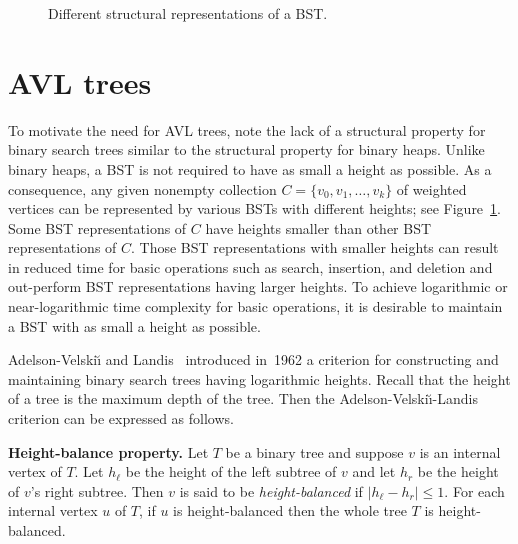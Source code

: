 \begin{figure}[!htbp]
\centering
{}

\caption{Different structural representations of a BST.}
\label{fig:tree_data_structures:BST_different_structural_representations}
\end{figure}



\section{AVL trees}

To motivate the need for AVL trees, note the lack of a
structural property for binary search trees
similar to the structural
property for binary heaps. Unlike binary heaps, a
BST is not required to have as small a height as possible. As a
consequence, any given nonempty collection
$C = \{v_0, v_1, \dots, v_k\}$ of weighted vertices can be represented
by various BSTs with different heights; see
Figure~\ref{fig:tree_data_structures:BST_different_structural_representations}.
Some BST representations of $C$ have heights smaller than other BST
representations of $C$. Those BST representations with smaller heights
can result in reduced time for basic operations such as search,
insertion, and deletion and out-perform BST representations having
larger heights. To achieve logarithmic or near-logarithmic time
complexity for basic operations, it is desirable to maintain a BST
with as small a height as possible.

Adelson-Velski\u{\i} and
Landis~\cite{AdelsonVelskiiLandis1962}
introduced in~1962 a criterion for constructing and maintaining binary
search trees having logarithmic heights. Recall that the height of a
tree is the maximum depth of the tree. Then the
Adelson-Velski\u{\i}-Landis criterion can be expressed as follows.

\begin{definition}
\textbf{Height-balance property.}
Let $T$ be a binary tree and suppose $v$ is an internal vertex of
$T$. Let $h_\ell$ be the height of the left subtree of $v$ and let
$h_r$ be the height of $v$'s right subtree. Then $v$ is said to be
\emph{height-balanced} if $|h_\ell - h_r| \leq 1$. For each internal
vertex $u$ of $T$, if $u$ is height-balanced then the whole tree $T$
is height-balanced.
\end{definition}

